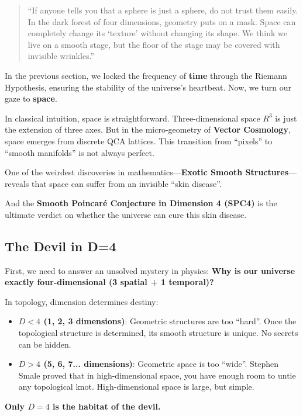 \documentclass[11pt,a4paper,twoside]{book}
\begin{document}
\begin{quote}
``If anyone tells you that a sphere is just a sphere, do not trust them easily. In the dark forest of four dimensions, geometry puts on a mask. Space can completely change its `texture' without changing its shape. We think we live on a smooth stage, but the floor of the stage may be covered with invisible wrinkles.''
\end{quote}

In the previous section, we locked the frequency of \textbf{time} through the Riemann Hypothesis, ensuring the stability of the universe's heartbeat. Now, we turn our gaze to \textbf{space}.

In classical intuition, space is straightforward. Three-dimensional space $R^3$ is just the extension of three axes. But in the micro-geometry of \textbf{Vector Cosmology}, space emerges from discrete QCA lattices. This transition from ``pixels'' to ``smooth manifolds'' is not always perfect.

One of the weirdest discoveries in mathematics—\textbf{Exotic Smooth Structures}—reveals that space can suffer from an invisible ``skin disease''.

And the \textbf{Smooth Poincaré Conjecture in Dimension 4 (SPC4)} is the ultimate verdict on whether the universe can cure this skin disease.

\subsection{The Devil in D=4}

First, we need to answer an unsolved mystery in physics: \textbf{Why is our universe exactly four-dimensional (3 spatial + 1 temporal)?}

In topology, dimension determines destiny:

\begin{itemize}
\item \textbf{$D < 4$ (1, 2, 3 dimensions)}: Geometric structures are too ``hard''. Once the topological structure is determined, its smooth structure is unique. No secrets can be hidden.

\item \textbf{$D > 4$ (5, 6, 7... dimensions)}: Geometric space is too ``wide''. Stephen Smale proved that in high-dimensional space, you have enough room to untie any topological knot. High-dimensional space is large, but simple.
\end{itemize}

\textbf{Only $D = 4$ is the habitat of the devil.}
\end{document}
